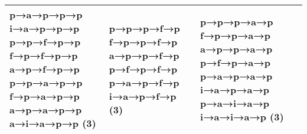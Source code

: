 \documentclass[lettersize,journal]{IEEEtran}
\begin{document}
\begin{table}[!tp]
{\begin{tabular}{|p{18mm}|p{21mm}|p{21mm}|p{21mm}|}
        p→a→p→p→p \newline
        i→a→p→p→p \newline
        p→p→f→p→p \newline
        f→p→f→p→p \newline
        a→p→f→p→p \newline
        p→p→a→p→p \newline
        f→p→a→p→p \newline
        a→p→a→p→p \newline
        a→i→a→p→p \newline
        (3)
                    & p→p→p→f→p \newline
                    f→p→p→f→p \newline
                    a→p→p→f→p \newline
                    p→f→p→f→p \newline
                    p→a→p→f→p \newline
                    i→a→p→f→p \newline
                    (3)
                                      & p→p→p→a→p \newline
                                        f→p→p→a→p \newline
                                        a→p→p→a→p \newline
                                        p→f→p→a→p \newline
                                        p→a→p→a→p \newline
                                        i→a→p→a→p \newline
                                        p→a→i→a→p \newline
                                        i→a→i→a→p \newline
                                        (3) \\
    \hline
    \end{tabular}
    }
    \end{table}
    
      
      
\end{document}
